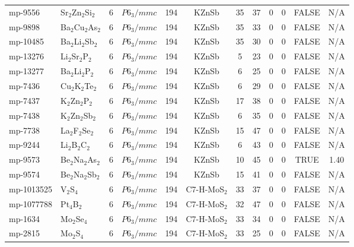 {\begin{longtable}{llcccccccccc}
    mp-9556 & Sr$_{2}$Zn$_{2}$Si$_{2}$ & 6     & $P6_3/mmc$ & 194   & KZnSb & 35    & 37    & 0     & 0     & FALSE & N/A \\
    mp-9898 & Ba$_{2}$Cu$_{2}$As$_{2}$ & 6     & $P6_3/mmc$ & 194   & KZnSb & 35    & 33    & 0     & 0     & FALSE & N/A \\
    mp-10485 & Ba$_{2}$Li$_{2}$Sb$_{2}$ & 6     & $P6_3/mmc$ & 194   & KZnSb & 35    & 30    & 0     & 0     & FALSE & N/A \\
    mp-13276 & Li$_{2}$Sr$_{2}$P$_{2}$ & 6     & $P6_3/mmc$ & 194   & KZnSb & 5     & 23    & 0     & 0     & FALSE & N/A \\
    mp-13277 & Ba$_{2}$Li$_{2}$P$_{2}$ & 6     & $P6_3/mmc$ & 194   & KZnSb & 6     & 25    & 0     & 0     & FALSE & N/A \\
    mp-7436 & Cu$_{2}$K$_{2}$Te$_{2}$ & 6     & $P6_3/mmc$ & 194   & KZnSb & 6     & 29    & 0     & 0     & FALSE & N/A \\
    mp-7437 & K$_{2}$Zn$_{2}$P$_{2}$ & 6     & $P6_3/mmc$ & 194   & KZnSb & 17    & 38    & 0     & 0     & FALSE & N/A \\
    mp-7438 & K$_{2}$Zn$_{2}$Sb$_{2}$ & 6     & $P6_3/mmc$ & 194   & KZnSb & 6     & 35    & 0     & 0     & FALSE & N/A \\
    mp-7738 & La$_{2}$F$_{2}$Se$_{2}$ & 6     & $P6_3/mmc$ & 194   & KZnSb & 15    & 47    & 0     & 0     & FALSE & N/A \\
    mp-9244 & Li$_{2}$B$_{2}$C$_{2}$ & 6     & $P6_3/mmc$ & 194   & KZnSb & 6     & 43    & 0     & 0     & FALSE & N/A \\
    mp-9573 & Be$_{2}$Na$_{2}$As$_{2}$ & 6     & $P6_3/mmc$ & 194   & KZnSb & 10    & 45    & 0     & 0     & TRUE  & 1.40  \\
    mp-9574 & Be$_{2}$Na$_{2}$Sb$_{2}$ & 6     & $P6_3/mmc$ & 194   & KZnSb & 15    & 41    & 0     & 0     & FALSE & N/A \\
    mp-1013525 & V$_{2}$S$_{4}$ & 6     & $P6_3/mmc$ & 194   & C7-H-MoS$_{2}$ & 33    & 37    & 0     & 0     & FALSE & N/A \\
    mp-1077788 & Pt$_{4}$B$_{2}$ & 6     & $P6_3/mmc$ & 194   & C7-H-MoS$_{2}$ & 32    & 47    & 0     & 0     & FALSE & N/A \\
    mp-1634 & Mo$_{2}$Se$_{4}$ & 6     & $P6_3/mmc$ & 194   & C7-H-MoS$_{2}$ & 33    & 34    & 0     & 0     & FALSE & N/A \\
    mp-2815 & Mo$_{2}$S$_{4}$ & 6     & $P6_3/mmc$ & 194   & C7-H-MoS$_{2}$ & 33    & 25    & 0     & 0     & FALSE & N/A \\

\end{longtable}}

